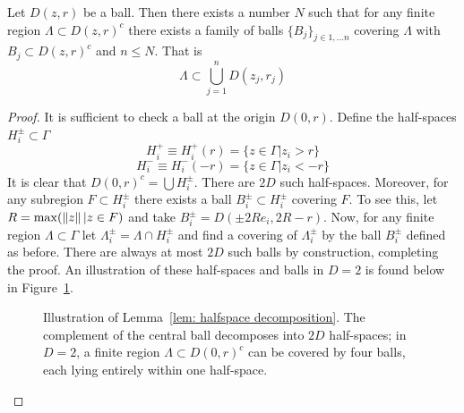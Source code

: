 \documentclass[11pt]{amsart}
\begin{document}
\begin{lem}\label{lem: halfspace decomposition}
    Let $D(z,r)$ be a ball. Then there exists a number $N$ such that for any finite region $\Lambda\subset D(z,r)^c$ there exists a family of balls $\{B_j\}_{j\in1,\ldots n}$  covering $\Lambda$ with $B_j\subset D(z,r)^c$  and $n\leq N$. That is 
    \[
        \Lambda\subset\bigcup_{j=1}^nD(z_j,r_j)
    \]
    \begin{proof}
        It is sufficient to check a ball at the origin $D(0,r)$. Define the half-spaces $H_i^\pm\subset\Gamma$ 
        \[
            H_i^+\equiv H_i^+(r)=\{z\in\Gamma|z_i>r\}
        \]
        \[
            H_i^-\equiv H_i^-(-r)=\{z\in\Gamma|z_i<-r\}
        \]
        It is clear that $D(0,r)^c=\bigcup H_i^\pm$. There are $2D$ such half-spaces. Moreover, for any subregion $F\subset H_i^\pm$ there exists a ball $B_i^\pm\subset H_i^\pm$ covering $F$. To see this, let $R=\max(\left\lVert z\right\rVert|z\in F)$ and take $B^\pm_i=D(\pm 2Re_i,2R-r)$. Now, for any finite region $\Lambda\subset \Gamma$ let $\Lambda_i^\pm=\Lambda\cap H_i^\pm$ and find a covering of $\Lambda_i^\pm$ by the ball $B_i^\pm$ defined as before. There are always at most $2D$ such balls by construction, completing the proof.  An illustration of these half-spaces and balls in $D=2$ is found below in Figure~\ref{fig:lemma45}.

    \begin{figure}[ht]
      \centering
      \resizebox{\textwidth}{!}{%
      }
      \caption{Illustration of Lemma~\ref{lem: halfspace decomposition}. The complement of the central
      ball decomposes into $2D$ half-spaces; in $D=2$,
      a finite region $\Lambda\subset D(0,r)^c$ can be covered by
      four balls, each lying entirely within one half-space.}
      \label{fig:lemma45}
    \end{figure}
    \end{proof}
\end{lem}
\end{document}
